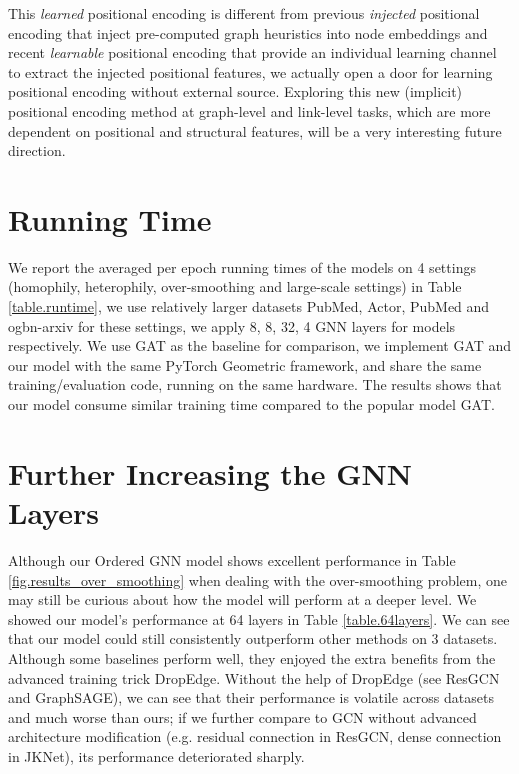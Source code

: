 \documentclass{article}
\begin{document}
This \textit{learned} positional encoding is different from previous \textit{injected} positional encoding \citep{zhang2018link,you2019position,li2020distance,bouritsas2022improving} that inject pre-computed graph heuristics into node embeddings and recent \textit{learnable} positional encoding \citep{dwivedi2021graph,wang2022equivariant} that provide an individual learning channel to extract the injected positional features, we actually open a door for learning positional encoding without external source. Exploring this new (implicit) positional encoding method at graph-level and link-level tasks, which are more dependent on positional and structural features, will be a very interesting future direction.


\section{Running Time}

We report the averaged per epoch running times of the models on 4 settings (homophily, heterophily, over-smoothing and large-scale settings) in Table \ref{table.runtime}, we use relatively larger datasets PubMed, Actor, PubMed and ogbn-arxiv for these settings, we apply 8, 8, 32, 4 GNN layers for models respectively. We use GAT as the baseline for comparison, we implement GAT and our model with the same PyTorch Geometric framework, and share the same training/evaluation code, running on the same hardware. The results shows that our model consume similar training time compared to the popular model GAT.

\section{Further Increasing the GNN Layers}
Although our Ordered GNN model shows excellent performance in Table \ref{fig.results_over_smoothing} when dealing with the over-smoothing problem, one may still be curious about how the model will perform at a deeper level. We showed our model's performance at 64 layers in Table \ref{table.64layers}. We can see that our model could still consistently outperform other methods on 3 datasets. Although some baselines perform well, they enjoyed the extra benefits from the advanced training trick DropEdge. Without the help of DropEdge (see ResGCN and GraphSAGE), we can see that their performance is volatile across datasets and much worse than ours; if we further compare to GCN without advanced architecture modification (e.g. residual connection in ResGCN, dense connection in JKNet), its performance deteriorated sharply.
\end{document}
